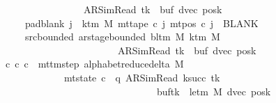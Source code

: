 \begin{isabellebody}
\ \ \ \ \ \ \ \ \ \ \ \ \ \ \ \ \ \ \ {\isacharparenleft}{\kern0pt}AR{\isacharunderscore}{\kern0pt}SimRead{\isacharcomma}{\kern0pt}\ tk{\isacharcomma}{\kern0pt}\ {}{\isacharcomma}{\kern0pt}\ buf{\isacharcomma}{\kern0pt}\ dvec{\isacharcomma}{\kern0pt}\ posk{\isacharparenright}{\kern0pt}{\isachardoublequoteclose}\isanewline
\ \ \ \ \ \ \ pad{\isacharunderscore}{\kern0pt}blank{\isacharcolon}{\kern0pt}\ {\isachardoublequoteopen}{\isasymforall}j\ {\isasymge}\ k{\isacharunderscore}{\kern0pt}tm\ M{\isachardot}{\kern0pt}\ mt{\isacharunderscore}{\kern0pt}tape\ c{\isacharprime}{\kern0pt}\ j\ {\isacharparenleft}{\kern0pt}mt{\isacharunderscore}{\kern0pt}pos\ c{\isacharprime}{\kern0pt}\ j{\isacharparenright}{\kern0pt}\ {\isacharequal}{\kern0pt}\ BLANK{}{\isachardoublequoteclose}\isanewline
\ \ \ \ \ \ \ src{\isacharunderscore}{\kern0pt}bounded{\isacharcolon}{\kern0pt}\ {\isachardoublequoteopen}ar{\isacharunderscore}{\kern0pt}stage{\isacharunderscore}{\kern0pt}bounded\ {\isacharparenleft}{\kern0pt}bl{\isacharunderscore}{\kern0pt}tm\ M{\isacharparenright}{\kern0pt}\ {\isacharparenleft}{\kern0pt}k{\isacharunderscore}{\kern0pt}tm\ M{\isacharparenright}{\kern0pt}\isanewline
\ \ \ \ \ \ \ \ \ \ \ \ \ \ \ \ \ \ \ \ \ \ \ \ \ \ {\isacharparenleft}{\kern0pt}AR{\isacharunderscore}{\kern0pt}SimRead{\isacharcomma}{\kern0pt}\ tk{\isacharcomma}{\kern0pt}\ {}{\isacharcomma}{\kern0pt}\ buf{\isacharcomma}{\kern0pt}\ dvec{\isacharcomma}{\kern0pt}\ posk{\isacharparenright}{\kern0pt}{\isachardoublequoteclose}\isanewline
\ \ \ {\isachardoublequoteopen}{\isasymexists}c{\isacharprime}{\kern0pt}{\isacharprime}{\kern0pt}{\isachardot}{\kern0pt}\ {\isacharparenleft}{\kern0pt}c{\isacharprime}{\kern0pt}{\isacharcomma}{\kern0pt}\ c{\isacharprime}{\kern0pt}{\isacharprime}{\kern0pt}{\isacharparenright}{\kern0pt}\ {\isasymin}\ mttm{\isacharunderscore}{\kern0pt}step\ {\isacharparenleft}{\kern0pt}alphabet{\isacharunderscore}{\kern0pt}reduce{\isacharunderscore}{\kern0pt}delta\ M{\isacharparenright}{\kern0pt}\isanewline
\ \ \ \ \ \ \ \ \ \ \ \ \ \ {\isasymand}\ mt{\isacharunderscore}{\kern0pt}state\ c{\isacharprime}{\kern0pt}{\isacharprime}{\kern0pt}\ {\isacharequal}{\kern0pt}\ {\isacharparenleft}{\kern0pt}q{\isacharcomma}{\kern0pt}\ AR{\isacharunderscore}{\kern0pt}SimRead{\isacharcomma}{\kern0pt}\ k{\isacharunderscore}{\kern0pt}succ\ tk{\isacharcomma}{\kern0pt}\ {}{\isacharcomma}{\kern0pt}\isanewline
\ \ \ \ \ \ \ \ \ \ \ \ \ \ \ \ \ \ \ \ \ \ \ \ \ \ \ \ \ \ \ \ \ \ buf{\isacharparenleft}{\kern0pt}tk\ {\isacharcolon}{\kern0pt}{\isacharequal}{\kern0pt}\ le{\isacharunderscore}{\kern0pt}tm\ M{\isacharparenright}{\kern0pt}{\isacharcomma}{\kern0pt}\ dvec{\isacharcomma}{\kern0pt}\ posk{\isacharparenright}{\kern0pt}\isanewline

\end{isabellebody}
